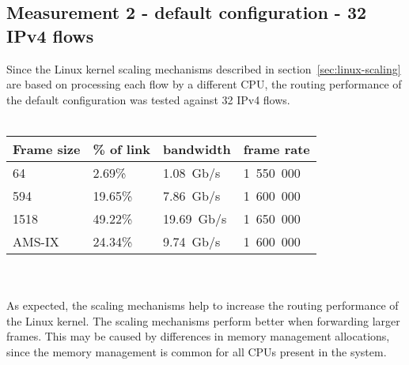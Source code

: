 
\subsection{Measurement 2 - default configuration - 32 IPv4 flows}
Since the Linux kernel scaling mechanisms described in section~\ref{sec:linux-scaling}
are based on processing each flow by a different CPU,
the routing performance of the default configuration was tested against 32 IPv4 flows.
\\
\\
\begin{tabular}{ | l | l | l | l | }
\hline
Frame size & \% of link & bandwidth & frame rate \\
\hline
64     &  2.69\% &  1.08~Gb/s & 1~550~000 \\
594    & 19.65\% &  7.86~Gb/s & 1~600~000 \\
1518   & 49.22\% & 19.69~Gb/s & 1~650~000 \\
AMS-IX & 24.34\% &  9.74~Gb/s & 1~600~000 \\
\hline
\end{tabular}
\\
\\
As expected, the scaling mechanisms help to increase the routing performance of the Linux kernel.
The scaling mechanisms perform better when forwarding larger frames.
This may be caused by differences in memory management allocations,
since the memory management is common for all CPUs present in the system.
